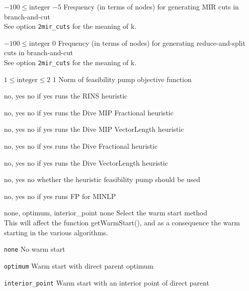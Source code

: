 %
{$-100\leq\textrm{integer}$}%
{$-5$}%
{Frequency (in terms of nodes) for generating MIR cuts in branch-and-cut\\
See option \texttt{2mir\_cuts} for the meaning of k.}%
{}

%
{$-100\leq\textrm{integer}$}%
{$0$}%
{Frequency (in terms of nodes) for generating reduce-and-split cuts in branch-and-cut\\
See option \texttt{2mir\_cuts} for the meaning of k.}%
{}

%
{$1\leq\textrm{integer}\leq2$}%
{$1$}%
{Norm of feasibility pump objective function}%
{}

%
{no, yes}%
{no}%
{if yes runs the RINS heuristic}%
{
}

%
{no, yes}%
{no}%
{if yes runs the Dive MIP Fractional heuristic}%
{
}

%
{no, yes}%
{no}%
{if yes runs the Dive MIP VectorLength heuristic}%
{
}

%
{no, yes}%
{no}%
{if yes runs the Dive Fractional heuristic}%
{
}

%
{no, yes}%
{no}%
{if yes runs the Dive VectorLength heuristic}%
{
}

%
{no, yes}%
{no}%
{whether the heuristic feasibility pump should be used}%
{
}

%
{no, yes}%
{no}%
{if yes runs FP for MINLP}%
{
}

%
{none, optimum, interior\_point}%
{none}%
{Select the warm start method\\
This will affect the function getWarmStart(), and as a consequence the warm starting in the various algorithms.}%
{\begin{list}{}{
\setlength{\parsep}{0em}
\setlength{\leftmargin}{5ex}
\setlength{\labelwidth}{2ex}
\setlength{\itemindent}{0ex}
\setlength{\topsep}{0pt}}
\item[\texttt{none}] No warm start
\item[\texttt{optimum}] Warm start with direct parent optimum
\item[\texttt{interior\_point}] Warm start with an interior point of direct parent
\end{list}
}

